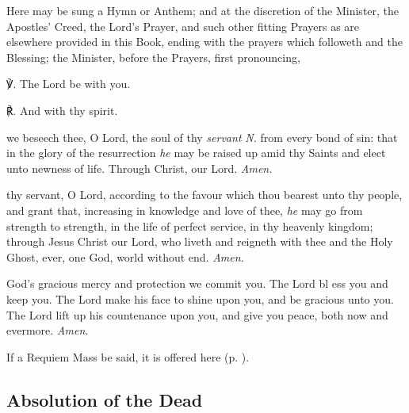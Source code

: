 \begin{rubric}
	Here may be sung a Hymn or Anthem; and at the discretion of the Minister, the Apostles' Creed, the Lord's Prayer, and such other fitting Prayers as are elsewhere provided in this Book, ending with the prayers which followeth and the Blessing; the Minister, before the Prayers, first pronouncing,
\end{rubric}

℣. The Lord be with you.

℟. And with thy spirit.

{} we beseech thee, O Lord, the soul of thy \textit{servant} \textit{N.} from every bond of sin: that in the glory of the resurrection \textit{he} may be raised up amid thy Saints and elect unto newness of life. Through Christ, our Lord. \textit{Amen.}

 thy servant, O Lord, according to the favour which thou bearest unto thy people, and grant that, increasing in knowledge and love of thee, \textit{he} may go from strength to strength, in the life of perfect service, in thy heavenly kingdom; through Jesus Christ our Lord, who liveth and reigneth with thee and the Holy Ghost, ever, one God, world without end. \textit{Amen.}

 God's gracious mercy and protection we commit you. The Lord bl {} ess you and keep you. The Lord make his face to shine upon you, and be gracious unto you. The Lord lift up his countenance upon you, and give you peace, both now and evermore. \textit{Amen.}

\begin{rubric}
    If a Requiem Mass be said, it is offered here (p. \pageref{RequiemMasses}).
\end{rubric}

%


\clearpage
\subsection{Absolution of the Dead}   

\vspace{-0.5\baselineskip}
  
